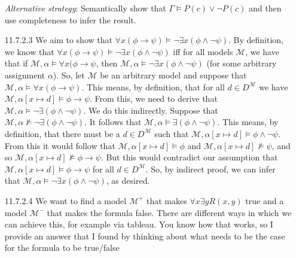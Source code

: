 \begin{itemize}
                \emph{Alternative strategy}: Semantically show that
                $\Gamma\vDash P(c)\lor\neg P(c)$ and then use
                completeness to infer the result.

                \item[11.7.2.3] We aim to show that $\forall
                  x(\phi\to\psi)\vDash\neg \exists x(\phi\land
                  \neg\psi)$. By definition, we know that $\forall
                  x(\phi\to\psi)\vDash\neg \exists x(\phi\land
                  \neg\psi)$ iff for all models $\mathcal{M}$, we have
                  that if $\mathcal{M},\alpha\vDash \forall
                  x(\phi\to\psi$, then $\mathcal{M},\alpha\vDash\neg
                  \exists x(\phi\land\neg\psi)$ (for some arbitrary
                  assignment $\alpha$). So, let $\mathcal{M}$ be an
                  arbitrary model and suppose that
                  $\mathcal{M},\alpha\vDash\forall x(\phi\to
                  \psi)$. This means, by definition, that for all
                  $d\in D^\mathcal{M}$ we have
                  $\mathcal{M},\alpha[x\mapsto d]\vDash
                  \phi\to\psi$. From this, we need to derive that
                  $\mathcal{M},\alpha\vDash\neg \exists
                  (\phi\land\neg\psi)$. We do this indirectly. Suppose
                  that $\mathcal{M},\alpha\nvDash\neg \exists
                  (\phi\land\neg\psi)$. It follows that  $\mathcal{M},\alpha\vDash \exists
                  (\phi\land\neg\psi)$. This means, by definition,
                  that there must be a $d\in D^\mathcal{M}$ such that
                  $\mathcal{M},\alpha[x\mapsto d]\vDash
                  \phi\land\neg\psi$. From this it would follow
                  that $\mathcal{M},\alpha[x\mapsto d]\vDash
                  \phi$ and $\mathcal{M},\alpha[x\mapsto
                  d]\nvDash\psi$, and so $\mathcal{M},\alpha[x\mapsto d]\nvDash
                  \phi\to\psi$. But this would contradict our
                  assumption that  $\mathcal{M},\alpha[x\mapsto d]\vDash
                  \phi\to\psi$ for all $d\in D^\mathcal{M}$. So, by
                  indirect proof, we can infer that  $\mathcal{M},\alpha\vDash\neg
                  \exists x(\phi\land\neg\psi)$, as desired.
                  
                  \item[11.7.2.4] We want to find a model
                    $\mathcal{M}^+$ that makes
                    $\forall x\exists yR(x,y)$ true and a model
                    $\mathcal{M}^-$ that makes the formula
                    false. There are different ways in which
                    we can achieve this, for example via tableau. You
                    know how that works, so I provide an answer that
                    I found by thinking about what needs to be the
                    case for the formula to be true/false


\end{itemize}
